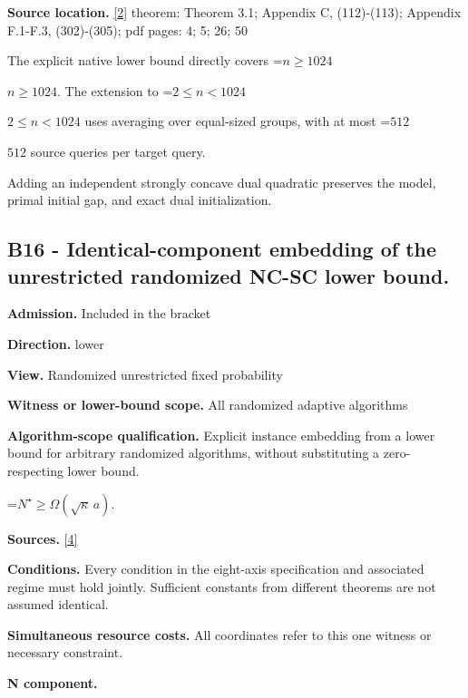 \documentclass[10pt,a4paper]{article}
\newcommand{\AtlasMath}[1]{\par\begingroup\centering\setbox0=\hbox{$\displaystyle #1$}\ifdim\wd0>1.4\linewidth\typeout{ATLAS WIDE FORMULA: \the\wd0}\fi\ifdim\wd0>\linewidth\resizebox{\linewidth}{!}{\box0}\else\box0\fi\par\endgroup}
\newcommand{\AtlasInlineMath}[1]{\begingroup\setbox0=\hbox{$#1$}\ifdim\wd0>.4\linewidth\endgroup\AtlasMath{#1}\else\endgroup$#1$\fi}
\begin{document}
\textbf{Source location.} \href{https://arxiv.org/pdf/2609.00045v3}{[2]} theorem: Theorem 3.1; Appendix C, (112)-(113); Appendix F.1-F.3, (302)-(305); pdf pages: 4; 5; 26; 50



The explicit native lower bound directly covers \AtlasInlineMath{n\ge1024}. The extension to \AtlasInlineMath{2\le n<1024} uses averaging over equal-sized groups, with at most \AtlasInlineMath{512} source queries per target query.



Adding an independent strongly concave dual quadratic preserves the model, primal initial gap, and exact dual initialization.



\subsection{B16 - Identical-component embedding of the unrestricted randomized NC-SC lower bound.}


\textbf{Admission.} Included in the bracket



\textbf{Direction.} lower



\textbf{View.} Randomized unrestricted fixed probability



\textbf{Witness or lower-bound scope.} All randomized adaptive algorithms



\textbf{Algorithm-scope qualification.} Explicit instance embedding from a lower bound for arbitrary randomized algorithms, without substituting a zero-respecting lower bound.



\AtlasMath{N^\star\ge\Omega(\sqrt\kappa\,a).}


\textbf{Sources.} \href{https://arxiv.org/pdf/2610.00229v2}{[4]}



\textbf{Conditions.} Every condition in the eight-axis specification and associated regime must hold jointly. Sufficient constants from different theorems are not assumed identical.



\textbf{Simultaneous resource costs.} All coordinates refer to this one witness or necessary constraint.



\textbf{N component.}
\end{document}
